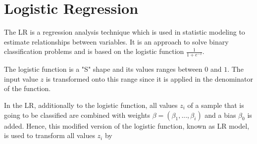

\section{Logistic Regression}
\label{sec:lr}

The \acf{LR} is a regression analysis technique which is used in statistic modeling to estimate relationships between variables. %
It is an approach to solve binary classification problems and is based on the logistic function $\frac{1}{1 + e^{-z}}$.

The logistic function is a "S" shape and its values ranges between $0$ and $1$.
The input value $z$ is transformed onto this range since it is applied in the denominator of the function. %

In the \ac{LR}, additionally to the logistic function, all values $z_i$ of a sample that is going to be classified are combined with weights $\beta =(\beta_1, ..., \beta_i)$ and a bias $\beta_0$ is added. %
Hence, this modified version of the logistic function, known as \ac{LR} model, is used to transform all values $z_i$ by 

